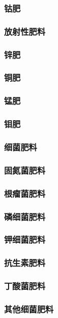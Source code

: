 \documentclass[UTF8]{../../ApplicationUniverse}
\begin{document}
    \subsubsection{钴肥}
    \subsubsection{放射性肥料}
    \subsubsection{锌肥}
    \subsubsection{铜肥}
    \subsubsection{锰肥}
    \subsubsection{钼肥}
\subsubsection{细菌肥料}
    \subsubsection{固氮菌肥料}
    \subsubsection{根瘤菌肥料}
    \subsubsection{磷细菌肥料}
    \subsubsection{钾细菌肥料}
    \subsubsection{抗生素肥料}
    \subsubsection{丁酸菌肥料}
    \subsubsection{其他细菌肥料}
\end{document}
